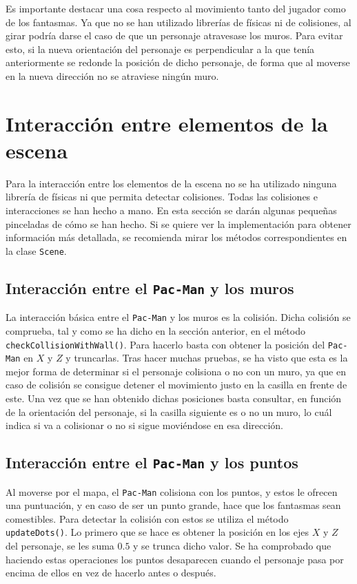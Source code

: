 \documentclass[11pt,a4paper]{article}
\begin{document}
Es importante destacar una cosa respecto al movimiento tanto del jugador como de los fantasmas.
Ya que no se han utilizado librerías de físicas ni de colisiones, al girar podría darse el caso
de que un personaje atravesase los muros. Para evitar esto, si la nueva orientación del
personaje es perpendicular a la que tenía anteriormente se redonde la posición de dicho
personaje, de forma que al moverse en la nueva dirección no se atraviese ningún muro. 

\section{Interacción entre elementos de la escena}

Para la interacción entre los elementos de la escena no se ha utilizado ninguna librería de
físicas ni que permita detectar colisiones. Todas las colisiones e interacciones se han hecho
a mano. En esta sección se darán algunas pequeñas pinceladas de cómo se han hecho. Si se quiere
ver la implementación para obtener información más detallada, se recomienda mirar los métodos
correspondientes en la clase \texttt{Scene}.

\subsection{Interacción entre el \texttt{Pac-Man} y los muros}

La interacción básica entre el \texttt{Pac-Man} y los muros es la colisión. Dicha colisión
se comprueba, tal y como se ha dicho en la sección anterior, en el método
\texttt{checkCollisionWithWall()}. Para hacerlo basta con obtener la posición
del \texttt{Pac-Man} en $X$ y $Z$ y truncarlas. Tras hacer muchas pruebas, se ha visto
que esta es la mejor forma de determinar si el personaje colisiona o no con un muro, ya que
en caso de colisión se consigue detener el movimiento justo en la casilla en frente de este.
Una vez que se han obtenido dichas posiciones basta consultar, en función de la orientación del
personaje, si la casilla siguiente es o no un muro, lo cuál indica si va a colisionar o no
si sigue moviéndose en esa dirección.

\subsection{Interacción entre el \texttt{Pac-Man} y los puntos}

Al moverse por el mapa, el \texttt{Pac-Man} colisiona con los puntos, y estos le ofrecen
una puntuación, y en caso de ser un punto grande, hace que los fantasmas sean comestibles.
Para detectar la colisión con estos se utiliza el método \texttt{updateDots()}. Lo primero que se
hace es obtener la posición en los ejes $X$ y $Z$ del personaje, se les suma $0.5$ y se trunca
dicho valor. Se ha comprobado que haciendo estas operaciones los puntos desaparecen cuando el
personaje pasa por encima de ellos en vez de hacerlo antes o después.
\end{document}
